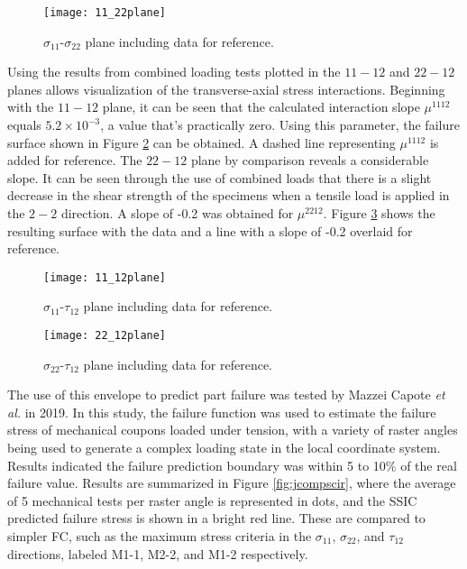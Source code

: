 \documentclass[main.tex]{subfiles}
\begin{document}
\begin{figure}[h]
	\center
	\texttt{[image: 11\_22plane]}
	\captionsetup{justification=centering} %
	\caption[failure envelope in the $\sigma_{11}$-$\sigma_{22}$ plane]{$\sigma_{11}$-$\sigma_{22}$ plane including data for reference.} \label{fig:1122plane}
\end{figure}

Using the results from combined loading tests plotted in the $11-12$ and $22-12$ planes allows visualization of the transverse-axial stress interactions. Beginning with the $11-12$ plane, it can be seen that the calculated interaction slope $\mu^{1112}$ equals $5.2\times 10^{-3}$, a value that's practically zero. Using this parameter, the failure surface shown in Figure \ref{fig:1112plane} can be obtained. A dashed line representing $\mu^{1112}$ is added for reference. The $22-12$ plane by comparison reveals a considerable slope. It can be seen through the use of combined loads that there is a slight decrease in the shear strength of the specimens when a tensile load is applied in the $2-2$ direction. A slope of -0.2 was obtained for $\mu^{2212}$. Figure \ref{fig:2212plane} shows the resulting surface with the data and a line with a slope of -0.2 overlaid for reference.

\begin{figure}[!htbp]
	\center
	\texttt{[image: 11\_12plane]}
	\captionsetup{justification=centering} %
	\caption[failure envelope in the $\sigma_{11}$-$\tau_{12}$ plane]{$\sigma_{11}$-$\tau_{12}$ plane including data for reference.} \label{fig:1112plane}
\end{figure}

\begin{figure}[!htbp]
	\center
	\texttt{[image: 22\_12plane]}
	\captionsetup{justification=centering} %
	\caption[failure envelope in the $\sigma_{22}$-$\tau_{12}$ plane]{$\sigma_{22}$-$\tau_{12}$ plane including data for reference.} \label{fig:2212plane}
\end{figure}

The use of this envelope to predict part failure was tested by Mazzei Capote \cite{MazzeiJCompSci} \emph{et al.} in 2019. In this study, the failure function was used to estimate the failure stress of mechanical coupons loaded under tension, with a variety of raster angles being used to generate a complex loading state in the local coordinate system. Results indicated the failure prediction boundary was within 5 to 10\% of the real failure value. Results are summarized in Figure \ref{fig:jcompscir}, where the average of 5 mechanical tests per raster angle is represented in dots, and the SSIC predicted failure stress is shown in a bright red line. These are compared to simpler FC, such as the maximum stress criteria in the $\sigma_{11}$, $\sigma_{22}$, and $\tau_{12}$ directions, labeled M1-1, M2-2, and M1-2 respectively. 
\end{document}
